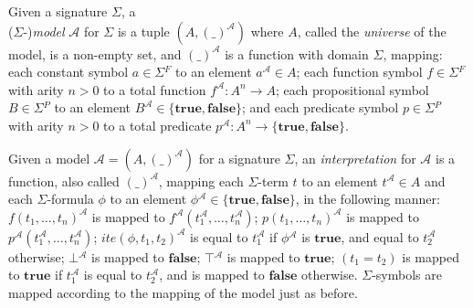 %

\begin{definition}[Model]
  Given a signature $\Sigma{}$, a \\ ($\Sigma{}$-)\textit{model} $\mathcal{A}$
  for $\Sigma{}$ is a tuple $(A, (\_)^{\mathcal{A}})$ where
  $A$, called the \textit{universe} of the model, is a non-empty set, and
  $(\_)^{\mathcal{A}}$ is a function with domain $\Sigma{}$, mapping:
    each constant symbol $a \in \Sigma{}^F$ to an element
      $a^{\mathcal{A}} \in A$;
    each function symbol $f \in \Sigma{}^F$ with arity $n > 0$ to a total
      function $f^{\mathcal{A}}\colon A^n \to A$;
    each propositional symbol $B \in \Sigma{}^P$ to an element
      $B^{\mathcal{A}} \in \{\mathbf{true}, \mathbf{false}\}$;
    and each predicate symbol $p \in \Sigma{}^P$ with arity $n > 0$ to a
      total predicate $p^{\mathcal{A}}\colon A^n \to \{\mathbf{true},
      \mathbf{false}\}$.
\end{definition}

\begin{definition}[Interpretation]
  Given a model $\mathcal{A} = (A, (\_)^{\mathcal{A}})$ for a signature
  $\Sigma{}$, an \textit{interpretation} for $\mathcal{A}$ is a function, also
  called $(\_)^{\mathcal{A}}$, mapping each $\Sigma{}$-term $t$ to an element
  $t^{\mathcal{A}}\in A$ and each $\Sigma{}$-formula $\phi{}$ to an element
  $\phi{}^{\mathcal{A}}\in \{\mathbf{true}, \mathbf{false}\}$, in the following
  manner:
  $f(t_1,\ldots,t_n)^{\mathcal{A}}$ is mapped to
    $f^{\mathcal{A}}(t_1^{\mathcal{A}},\ldots,t_n^{\mathcal{A}})$;
  $p(t_1,\ldots,t_n)^{\mathcal{A}}$ is mapped to
    $p^{\mathcal{A}}(t_1^{\mathcal{A}},\ldots,t_n^{\mathcal{A}})$;
  $ite(\phi{}, t_1, t_2)^{\mathcal{A}}$ is equal to $t_1^{\mathcal{A}}$ if
    $\phi{}^{\mathcal{A}}$ is $\mathbf{true}$, and equal to $t_2^{\mathcal{A}}$
    otherwise;
  $\bot{}^{\mathcal{A}}$ is mapped to $\mathbf{false}$;
  $\top{}^{\mathcal{A}}$ is mapped to $\mathbf{true}$;
  $(t_1 = t_2)$ is mapped to $\mathbf{true}$ if
    $t_1^{\mathcal{A}}$ is equal to $ t_2^{\mathcal{A}}$, and is mapped to
    $\mathbf{false}$ otherwise.
  $\Sigma$-symbols are mapped according to the mapping of the model just
    as before.
\end{definition}

